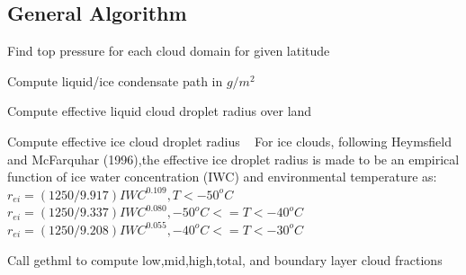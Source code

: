 \hypertarget{group__module__radsw__main_general}{}\subsection{General Algorithm}\label{group__module__radsw__main_general}

\begin{DoxyEnumerate}
\item Find top pressure for each cloud domain for given latitude
\item Compute liquid/ice condensate path in $ g/m^2 $
\item Compute effective liquid cloud droplet radius over land
\item Compute effective ice cloud droplet radius ~\newline
 For ice clouds, following Heymsfield and Mc\+Farquhar (1996),the effective ice droplet radius is made to be an empirical function of ice water concentration (I\+WC) and environmental temperature as\+: ~\newline
 $ r_{ei} = (1250/9.917)IWC^{0.109},T<-50^oC $ ~\newline
 $ r_{ei} = (1250/9.337)IWC^{0.080},-50^oC<=T<-40^oC $ ~\newline
 $ r_{ei} = (1250/9.208)IWC^{0.055},-40^oC<=T<-30^oC $ ~\newline

\item Call gethml to compute low,mid,high,total, and boundary layer cloud fractions 
\end{DoxyEnumerate}

